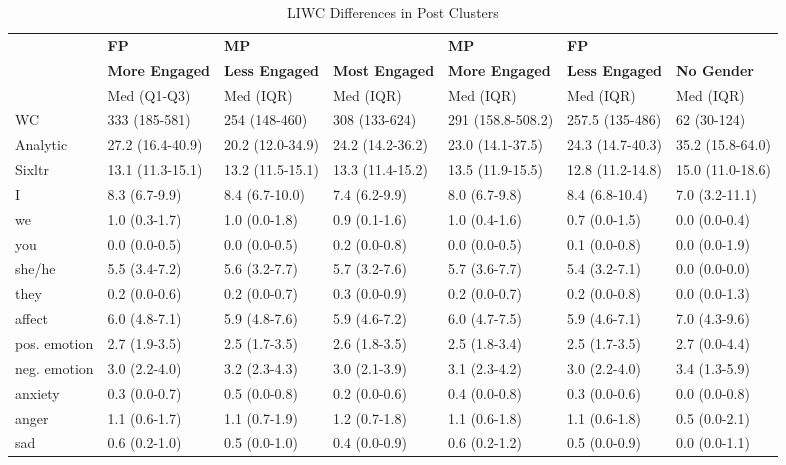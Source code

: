 \begin{table*}
\caption{LIWC Differences in Post Clusters}
\label{tab:postclusterLIWC}
\small
\begin{tabular}{l|l|l|l|l|l|l}
\hline
 & \textbf{FP} & \textbf{MP} &  & \textbf{MP} & \textbf{FP} &  \\
  & \textbf{More Engaged} & \textbf{Less Engaged} & \textbf{Most Engaged} & \textbf{More Engaged} & \textbf{Less Engaged} &\textbf{No Gender} \\
 & Med (Q1-Q3) & Med (IQR) & Med (IQR) & Med (IQR) & Med (IQR) & Med (IQR) \\
 \hline
WC & 333 (185-581) & 254 (148-460) & 308 (133-624) & 291 (158.8-508.2) & 257.5 (135-486) & 62 (30-124) \\
Analytic & 27.2 (16.4-40.9) & 20.2 (12.0-34.9) & 24.2 (14.2-36.2) & 23.0 (14.1-37.5) & 24.3 (14.7-40.3) & 35.2 (15.8-64.0) \\
Sixltr & 13.1 (11.3-15.1) & 13.2 (11.5-15.1) & 13.3 (11.4-15.2) & 13.5 (11.9-15.5) & 12.8 (11.2-14.8) & 15.0 (11.0-18.6) \\
I & 8.3 (6.7-9.9) & 8.4 (6.7-10.0) & 7.4 (6.2-9.9) & 8.0 (6.7-9.8) & 8.4 (6.8-10.4) & 7.0 (3.2-11.1) \\
we & 1.0 (0.3-1.7) & 1.0 (0.0-1.8) & 0.9 (0.1-1.6) & 1.0 (0.4-1.6) & 0.7 (0.0-1.5) & 0.0 (0.0-0.4) \\
you & 0.0 (0.0-0.5) & 0.0 (0.0-0.5) & 0.2 (0.0-0.8) & 0.0 (0.0-0.5) & 0.1 (0.0-0.8) & 0.0 (0.0-1.9) \\
she/he & 5.5 (3.4-7.2) & 5.6 (3.2-7.7) & 5.7 (3.2-7.6) & 5.7 (3.6-7.7) & 5.4 (3.2-7.1) & 0.0 (0.0-0.0) \\
they & 0.2 (0.0-0.6) & 0.2 (0.0-0.7) & 0.3 (0.0-0.9) & 0.2 (0.0-0.7) & 0.2 (0.0-0.8) & 0.0 (0.0-1.3) \\
affect & 6.0 (4.8-7.1) & 5.9 (4.8-7.6) & 5.9 (4.6-7.2) & 6.0 (4.7-7.5) & 5.9 (4.6-7.1) &7.0 (4.3-9.6) \\
pos. emotion & 2.7 (1.9-3.5) & 2.5 (1.7-3.5) & 2.6 (1.8-3.5) & 2.5 (1.8-3.4) & 2.5 (1.7-3.5) & 2.7 (0.0-4.4) \\
neg. emotion & 3.0 (2.2-4.0) & 3.2 (2.3-4.3) & 3.0 (2.1-3.9) & 3.1 (2.3-4.2) & 3.0 (2.2-4.0) &3.4 (1.3-5.9) \\
anxiety & 0.3 (0.0-0.7) & 0.5 (0.0-0.8) & 0.2 (0.0-0.6) & 0.4 (0.0-0.8) & 0.3 (0.0-0.6) & 0.0 (0.0-0.8) \\
anger & 1.1 (0.6-1.7) & 1.1 (0.7-1.9) &1.2 (0.7-1.8) & 1.1 (0.6-1.8) & 1.1 (0.6-1.8) &0.5 (0.0-2.1) \\
sad & 0.6 (0.2-1.0) & 0.5 (0.0-1.0) & 0.4 (0.0-0.9) & 0.6 (0.2-1.2) & 0.5 (0.0-0.9) & 0.0 (0.0-1.1) \\

\end{tabular}
\end{table*}

